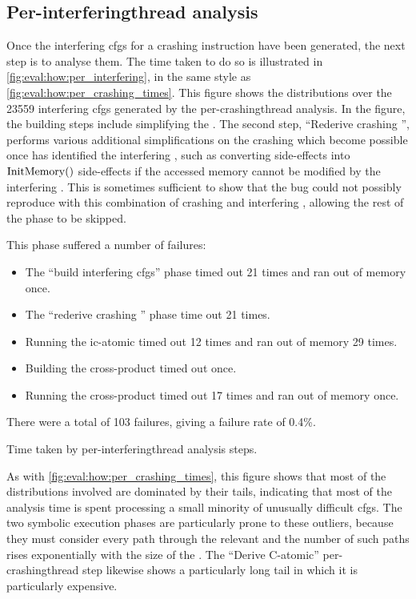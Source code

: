 \subsection{Per-\gls{interferingthread} analysis}

Once the interfering \glspl{cfg} for a crashing instruction have been
generated, the next step is to analyse them.  The time taken to do so
is illustrated in \autoref{fig:eval:how:per_interfering}, in the same
style as \autoref{fig:eval:how:per_crashing_times}.  This figure shows
the distributions over the 23559 interfering \glspl{cfg} generated by
the per-\gls{crashingthread} analysis.  In the figure, the
{\StateMachine} building steps include simplifying the
{\StateMachines}.  The second step, ``Rederive crashing
{\StateMachine}'', performs various additional simplifications on the
crashing {\StateMachine} which become possible once {\technique} has
identified the interfering {\StateMachine}, such as converting
\stLoad{}{} side-effects into $\mathrm{InitMemory}()$ side-effects if the accessed
memory cannot be modified by the interfering {\StateMachine}.  This is
sometimes sufficient to show that the bug could not possibly reproduce
with this combination of crashing and interfering {\StateMachines},
allowing the rest of the phase to be skipped.  

This phase suffered a number of failures:
\begin{itemize}
\item The ``build interfering \glspl{cfg}'' phase timed out 21 times
  and ran out of memory once.
\item The ``rederive crashing {\StateMachine}'' phase time out 21
  times.
\item Running the \gls{ic-atomic} {\StateMachine} timed out 12 times
  and ran out of memory 29 times.
\item Building the cross-product {\StateMachine} timed out once.
\item Running the cross-product {\StateMachine} timed out 17 times and
  ran out of memory once.
\end{itemize}
There were a total of 103 failures, giving a failure rate of 0.4\%.

\begin{sanefig}
  \caption{Time taken by per-\gls{interferingthread} analysis steps.}
\end{sanefig}

As with \autoref{fig:eval:how:per_crashing_times}, this figure shows
that most of the distributions involved are dominated by their tails,
indicating that most of the analysis time is spent processing a small
minority of unusually difficult \glspl{cfg}.  The two symbolic
execution phases are particularly prone to these outliers, because
they must consider every path through the relevant {\StateMachine} and
the number of such paths rises exponentially with the size of the
{\StateMachine}.  The ``Derive C-atomic'' per-\gls{crashingthread}
step likewise shows a particularly long tail in which it is
particularly expensive.

